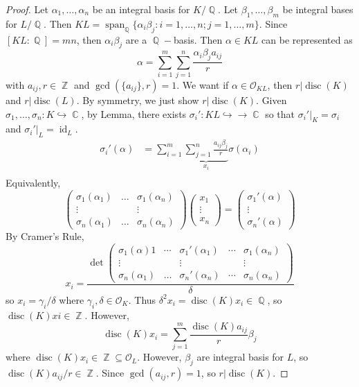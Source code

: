 \documentclass[11pt, a4paper]{memoir}
\DeclareMathOperator{\Q}{{\mathbb{Q}}}
\DeclareMathOperator{\Z}{{\mathbb{Z}}}
\DeclareMathOperator{\C}{{\mathbb{C}}}
\theoremstyle{change}
\theoremstyle{plain}
\theoremstyle{nonumberplain}
\newtheorem{proof}{Proof}
\DeclareMathOperator{\disc}{disc}
\DeclareMathOperator{\id}{id}
\DeclareMathOperator{\spn}{span}
\begin{document}
\begin{proof}
    Let $\alpha_1,\ldots,\alpha_n$ be an integral basis for $K/\Q$.
    Let $\beta_1,\ldots,\beta_m$ be integral bases for $L/\Q$.
    Then $KL=\spn_{\Q}\{\alpha_i\beta_j:i=1,\ldots,n;j=1,\ldots,m\}$.
    Since $[KL:\Q]=mn$, then $\alpha_i\beta_j$ are a $\Q-$basis.
    Then $\alpha\in KL$ can be represented as
    \begin{equation*}
        \alpha=\sum\limits_{i=1}^m\sum\limits_{j=1}^n\frac{\alpha_i\beta_ja_{ij}}{r}
    \end{equation*}
    with $a_{ij},r\in\Z$ and $\gcd(\{a_{ij}\},r)=1$.
    We want if $\alpha\in\mathcal{O}_{KL}$, then $r|\disc(K)$ and $r|\disc(L)$.
    By symmetry, we just show $r|\disc(K)$.
    Given $\sigma_1,\ldots,\sigma_n:K\hookrightarrow\C$, by Lemma, there exists $\sigma_i':KL\hookrightarrow\to\C$ so that $\sigma_i'|_K=\sigma_i$ and $\sigma_i'|_L=\id_L$.
    \begin{align*}
        \sigma_i'(\alpha) &= \sum\limits_{i=1}^m\underbrace{\sum\limits_{j=1}^n\frac{a_{ij}\beta_j}{r}}_{x_i}\sigma(\alpha_i)\\
    \end{align*}
    Equivalently,
    \begin{equation*}
        \begin{pmatrix}
            \sigma_1(\alpha_1)&\hdots&\sigma_1(\alpha_n)\\
            \vdots&&\vdots\\
            \sigma_n(\alpha_1)&\hdots&\sigma_n(\alpha_n)
        \end{pmatrix}
        \begin{pmatrix}
            x_1\\\vdots\\x_n
        \end{pmatrix}
        =
        \begin{pmatrix}
            \sigma_1'(\alpha)\\\vdots\\\sigma_n'(\alpha)
        \end{pmatrix}
    \end{equation*}
    By Cramer's Rule,
    \begin{equation*}
        x_i=\frac{\det\begin{pmatrix}\sigma_1(\alpha)1&\cdots&\sigma_1'(\alpha_1)&\cdots&\sigma_1(\alpha_n)\\
                \vdots&&\vdots&&\vdots\\
                \sigma_n(\alpha_1)&\hdots&\sigma_n'(\alpha_n)&\cdots&\sigma_n(\alpha_n)
        \end{pmatrix}}{\delta}
    \end{equation*}
    so $x_i=\gamma_i/\delta$ where $\gamma_i,\delta\in\mathcal{O}_K$.
    Thus $\delta^2x_i=\disc(K)x_i\in\Q$, so $\disc(K)xi\in\Z$.
    However,
    \begin{equation*}
        \disc(K)x_i = \sum\limits_{j=1}^m\frac{\disc(K)a_{ij}}{r}\beta_j
    \end{equation*}
    where $\disc(K)x_i\in\Z\subseteq\mathcal{O}_L$.
    However, $\beta_j$ are integral basis for $L$, so $\disc(K)a_{ij}/r\in\Z$.
    Since $\gcd(a_{ij},r)=1$, so $r|\disc(K)$.
\end{proof}
\end{document}
